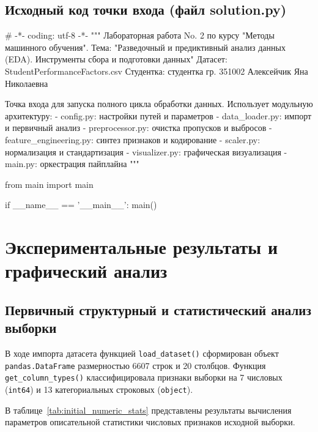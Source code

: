 \documentclass[14pt,a4paper]{extarticle}
\begin{document}
\subsection{Исходный код точки входа (файл solution.py)}
\begin{CodeListing}
# -*- coding: utf-8 -*-
"""
Лабораторная работа No.  2 по курсу "Методы машинного обучения".
Тема: "Разведочный и предиктивный анализ данных (EDA).
Инструменты сбора и подготовки данных"
Датасет: StudentPerformanceFactors.csv
Студентка: студентка гр. 351002 Алексейчик Яна Николаевна

Точка входа для запуска полного цикла обработки данных.
Использует модульную архитектуру:
- config.py: настройки путей и параметров
- data_loader.py: импорт и первичный анализ
- preprocessor.py: очистка пропусков и выбросов
- feature_engineering.py: синтез признаков и кодирование
- scaler.py: нормализация и стандартизация
- visualizer.py: графическая визуализация
- main.py: оркестрация пайплайна
"""

from main import main

if __name__ == '__main__':
    main()\end{CodeListing}

\clearpage
\section{Экспериментальные результаты и графический анализ}

\subsection{Первичный структурный и статистический анализ выборки}

В ходе импорта датасета функцией \texttt{load\_dataset()} сформирован объект \texttt{pandas.DataFrame} размерностью 6607 строк и 20 столбцов. Функция \texttt{get\_column\_types()} классифицировала признаки выборки на 7 числовых (\texttt{int64}) и 13 категориальных строковых (\texttt{object}).

В таблице~\ref{tab:initial_numeric_stats} представлены результаты вычисления параметров описательной статистики числовых признаков исходной выборки.
\end{document}
